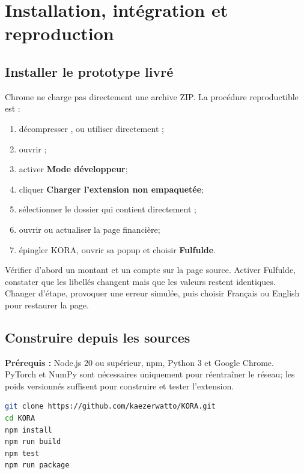 \section{Installation, intégration et reproduction}

\subsection{Installer le prototype livré}

Chrome ne charge pas directement une archive ZIP. La procédure reproductible
est :

\begin{enumerate}
  \item décompresser , ou utiliser directement
        ;
  \item ouvrir ;
  \item activer \textbf{Mode développeur};
  \item cliquer \textbf{Charger l’extension non empaquetée};
  \item sélectionner le dossier qui contient directement
        ;
  \item ouvrir ou actualiser la page financière;
  \item épingler KORA, ouvrir sa popup et choisir \textbf{Fulfulde}.
\end{enumerate}

\begin{keybox}
Vérifier d’abord un montant et un compte sur la page source. Activer Fulfulde,
constater que les libellés changent mais que les valeurs restent identiques.
Changer d’étape, provoquer une erreur simulée, puis choisir Français ou
English pour restaurer la page.
\end{keybox}

\subsection{Construire depuis les sources}

\textbf{Prérequis :} Node.js 20 ou supérieur, npm, Python 3 et Google Chrome.
PyTorch et NumPy sont nécessaires uniquement pour réentraîner le réseau; les
poids versionnés suffisent pour construire et tester l’extension.

\begin{lstlisting}[language=bash]
git clone https://github.com/kaezerwatto/KORA.git
cd KORA
npm install
npm run build
npm test
npm run package
\end{lstlisting}

